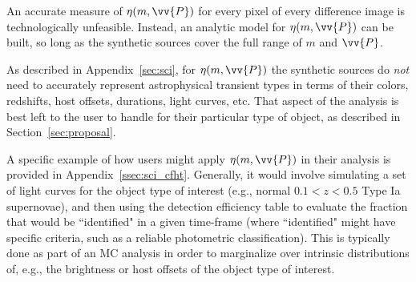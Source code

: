 \documentclass[DM,lsstdraft,toc]{lsstdoc}
\begin{document}
An accurate measure of $\eta(m,\vv{P})$ for every pixel of every difference image is technologically unfeasible.
Instead, an analytic model for $\eta(m,\vv{P})$ can be built, so long as the synthetic sources cover the full range of $m$ and $\vv{P}$.

As described in Appendix~\ref{sec:sci}, for $\eta(m,\vv{P})$ the synthetic sources do {\it not} need to accurately represent astrophysical transient types in terms of their colors, redshifts, host offsets, durations, light curves, etc.
That aspect of the analysis is best left to the user to handle for their particular type of object, as described in Section~\ref{sec:proposal}.

A specific example of how users might apply $\eta(m,\vv{P})$ in their analysis is provided in Appendix~\ref{ssec:sci_cfht}.
Generally, it would involve simulating a set of light curves for the object type of interest (e.g., normal $0.1<z<0.5$ Type Ia supernovae), and then using the detection efficiency table to evaluate the fraction that would be ``identified" in a given time-frame (where ``identified" might have specific criteria, such as a reliable photometric classification).
This is typically done as part of an MC analysis in order to marginalize over intrinsic distributions of, e.g., the brightness or host offsets of the object type of interest.
\end{document}
